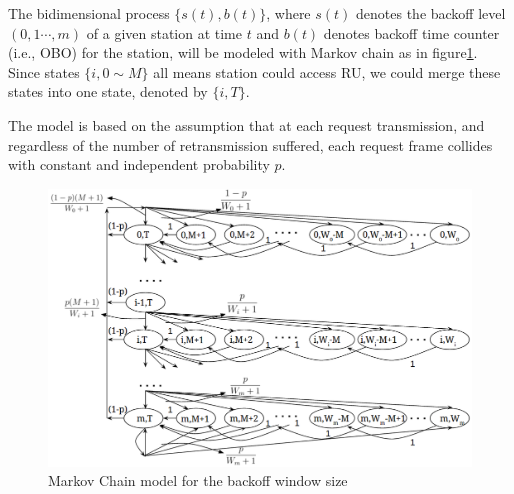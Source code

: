 \documentclass[journal]{IEEEtran}
\begin{document}
The bidimensional process $\lbrace s(t),b(t) \rbrace$, where $s(t)$ denotes the backoff level $(0,1\cdots ,m)$ of a given station at time $t$ and $b(t)$ denotes backoff time counter (i.e., OBO) for the station, will be modeled with Markov chain as in figure\ref{Markov}. 
Since states $\lbrace i,0\sim M \rbrace$ all means station could access RU, we could merge these states into one state, denoted by $\lbrace i, T \rbrace$. 

The model is based on the assumption that at each request transmission, and regardless of the number of retransmission suffered, each request frame collides with constant and independent probability $p$.

\begin{figure}[!t]
\includegraphics[scale=.45]{./figure/Markov_chain.png}
\caption{Markov Chain model for the backoff window size}
\label{Markov}
\end{figure}
\end{document}
